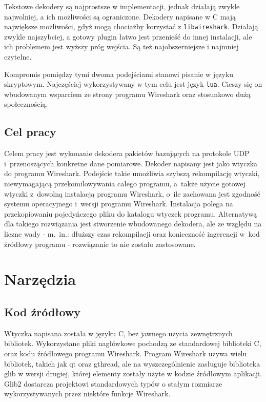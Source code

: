 \documentclass[a4paper, 12pt, twoside, openright]{article}
\begin{document}
	Tekstowe dekodery są najprostsze w implementacji, jednak działają zwykle najwolniej, a ich możliwości są ograniczone.
	Dekodery napisane w C mają największe możliwości, gdyż mogą chociażby korzystać z \texttt{libwireshark}. Działają zwykle
	najszybciej, a gotowy plugin łatwo jest przenieść do innej instalacji, ale ich problemem jest wyższy próg wejścia. 
	Są też najobszerniejsze i najmniej czytelne.

	Kompromis pomiędzy tymi dwoma podejściami stanowi pisanie w języku skryptowym. Najczęściej wykorzystywany w tym celu jest
	język \texttt{lua}. Cieszy się on wbudowanym wsparciem ze strony programu Wireshark oraz stosunkowo dużą społecznością.



\subsection{Cel pracy}

	\indent\par
	Celem pracy jest wykonanie dekodera pakietów bazujących na protokole UDP i~przenoszących konkretne dane pomiarowe.
	Dekoder napisany jest jako wtyczka do programu Wireshark. Podejście takie umożliwia szybszą rekompilację wtyczki,
	niewymagającą przekomilowywania całego programu, a~także użycie gotowej wtyczki z~dowolną instalacją programu Wireshark,
	o~ile zachowana jest zgodność systemu operacyjnego i~wersji programu Wireshark. Instalacja polega na przekopiowaniu
	pojedyńczego pliku do katalogu wtyczek programu. Alternatywą dla takiego rozwiązania jest stworzenie wbudowanego dekodera,
	ale ze względu na liczne wady - m.~in.: dłuższy czas rekompilacji oraz konieczność ingerencji w~kod źródłowy programu - rozwiązanie
	to nie zostało zastosowane.


\newpage
\section{Narzędzia}
\subsection{Kod źródłowy}

	\indent\par
	Wtyczka napisana została w języku C, bez jawnego użycia zewnętrznych bibliotek. Wykorzystane pliki nagłówkowe
	pochodzą ze standardowej biblioteki C, oraz kodu źródłowego programu Wireshark. Program Wireshark używa wielu
	bibliotek, takich jak qt oraz gthread, ale na wyszczególnienie zasługuje biblioteka glib w wersji drugiej, której
	elementy zostały użyte w kodzie źródłowym aplikacji. Glib2 dostarcza projektowi standardowych typów o stałym
	rozmiarze wykorzystywanych przez niektóre funkcje Wireshark.
	
\end{document}
